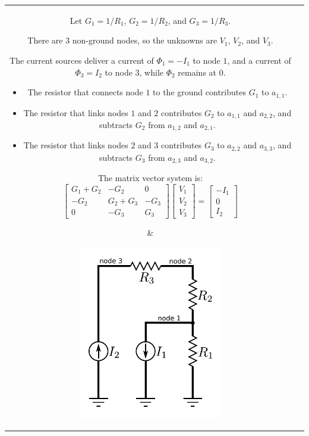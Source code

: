 \documentclass{article}
\begin{document}
\begin{tabular}{cc}
\parbox{0.5\textwidth}{  
Let \(G_1 = 1/R_1\), \(G_2 = 1/R_2\), and \(G_3 = 1/R_3\).      

There are \(3\) non-ground nodes, so the unknowns are \(V_1\), \(V_2\), and \(V_3\). 

The current sources deliver a current of \(\Phi_1 = -I_1\) to node \(1\), and a current of \(\Phi_3 = I_2\) to node \(3\), while \(\Phi_2\) remains at \(0\).

\begin{itemize}
\item The resistor that connects node \(1\) to the ground contributes \(G_1\) to \(a_{1,1}\). 
\item The resistor that links nodes \(1\) and \(2\) contributes \(G_2\) to \(a_{1,1}\) and \(a_{2,2}\), and subtracts \(G_2\) from \(a_{1,2}\) and \(a_{2,1}\). 
\item The resistor that links nodes \(2\) and \(3\) contributes \(G_3\) to \(a_{2,2}\) and \(a_{3,3}\), and subtracts \(G_3\) from \(a_{2,3}\) and \(a_{3,2}\).
\end{itemize}

The matrix vector system is:
\[\begin{bmatrix} G_1 + G_2 & -G_2 & 0 \\ -G_2 & G_2 + G_3 & -G_3 \\ 0 & -G_3 & G_3\end{bmatrix}
\begin{bmatrix} V_1 \\ V_2 \\ V_3 \end{bmatrix} = 
\begin{bmatrix} -I_1 \\ 0 \\ I_2 \end{bmatrix}\]
} & \parbox{0.5\textwidth}{
\includegraphics[width = 0.5\textwidth]{series_circuit_2}
}
\end{tabular}
\end{document}
